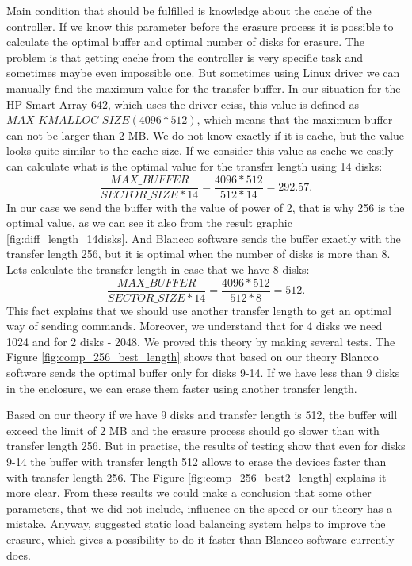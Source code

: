 Main condition that should be fulfilled is knowledge about the cache of the controller. If we know this parameter before the erasure process it is possible to calculate the optimal buffer and optimal number of disks for erasure. The problem is that getting cache from the controller is very specific task and sometimes maybe even impossible one. But sometimes using Linux driver we can manually find the maximum value for the transfer buffer. In our situation for the HP Smart Array 642, which uses the driver cciss, this value is defined as $MAX\_KMALLOC\_SIZE (4096*512)$, which means that the maximum buffer can not be larger than 2 MB. We do not know exactly if it is cache, but the value looks quite similar to the cache size. If we consider this value as cache we easily can calculate what is the optimal value for the transfer length using 14 disks:
\begin{equation}
	\frac{MAX\_BUFFER}{SECTOR\_SIZE*14} = \frac{4096*512}{512*14} = 292.57.
\end{equation}
In our case we send the buffer with the value of power of 2, that is why 256 is the optimal value, as we can see it also from the result graphic \ref{fig:diff_length_14disks}. And Blancco software sends the buffer exactly with the transfer length 256, but it is optimal when the number of disks is more than 8. Lets calculate the transfer length in case that we have 8 disks:
\begin{equation}
	\frac{MAX\_BUFFER}{SECTOR\_SIZE*14} = \frac{4096*512}{512*8} = 512.
\end{equation}
This fact explains that we should use another transfer length to get an optimal way of sending commands. Moreover, we understand that for 4 disks we need 1024 and for 2 disks - 2048. We proved this theory by making several tests. The Figure \ref{fig:comp_256_best_length} shows that based on our theory Blancco software sends the optimal buffer only for disks 9-14. If we have less than 9 disks in the enclosure, we can erase them faster using another transfer length.

Based on our theory if we have 9 disks and transfer length is 512, the buffer will exceed the limit of 2 MB and the erasure process should go slower than with transfer length 256. But in practise, the results of testing show that even for disks 9-14 the buffer with transfer length 512 allows to erase the devices faster than with transfer length 256. The Figure \ref{fig:comp_256_best2_length} explains it more clear. From these results we could make a conclusion that some other parameters, that we did not include, influence on the speed or our theory has a mistake. Anyway, suggested static load balancing system helps to improve the erasure, which gives a possibility to do it faster than Blancco software currently does.

